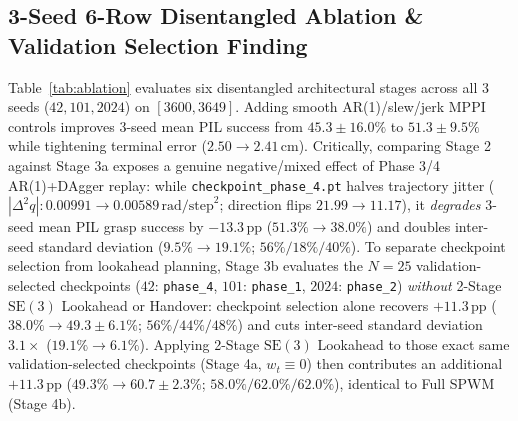 \documentclass[11pt]{article}
\begin{document}
\subsection{3-Seed 6-Row Disentangled Ablation \& Validation Selection Finding}

Table~\ref{tab:ablation} evaluates six disentangled architectural stages across all 3 seeds ($42, 101, 2024$) on $[3600, 3649]$. Adding smooth AR(1)/slew/jerk MPPI controls improves 3-seed mean PIL success from $45.3 \pm 16.0\%$ to $51.3 \pm 9.5\%$ while tightening terminal error ($2.50 \to 2.41\,\text{cm}$). Critically, comparing Stage 2 against Stage 3a exposes a genuine negative/mixed effect of Phase 3/4 AR(1)+DAgger replay: while \texttt{checkpoint\_phase\_4.pt} halves trajectory jitter ($|\Delta^2 q|: 0.00991 \to 0.00589\,\text{rad/step}^2$; direction flips $21.99 \to 11.17$), it \emph{degrades} 3-seed mean PIL grasp success by $-13.3\,\text{pp}$ ($51.3\% \to 38.0\%$) and doubles inter-seed standard deviation ($9.5\% \to 19.1\%$; $56\% / 18\% / 40\%$). To separate checkpoint selection from lookahead planning, Stage 3b evaluates the $N=25$ validation-selected checkpoints ($42$: \texttt{phase\_4}, $101$: \texttt{phase\_1}, $2024$: \texttt{phase\_2}) \emph{without} 2-Stage $\text{SE}(3)$ Lookahead or Handover: checkpoint selection alone recovers $+11.3\,\text{pp}$ ($38.0\% \to 49.3 \pm 6.1\%$; $56\% / 44\% / 48\%$) and cuts inter-seed standard deviation $3.1\times$ ($19.1\% \to 6.1\%$). Applying 2-Stage $\text{SE}(3)$ Lookahead to those exact same validation-selected checkpoints (Stage 4a, $w_t \equiv 0$) then contributes an additional $+11.3\,\text{pp}$ ($49.3\% \to 60.7 \pm 2.3\%$; $58.0\% / 62.0\% / 62.0\%$), identical to Full SPWM (Stage 4b).
\end{document}
